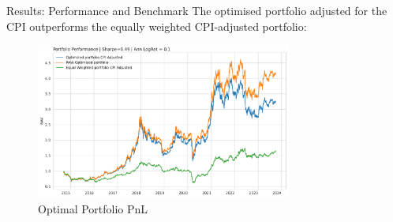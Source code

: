 \documentclass{beamer}
\begin{document}
\begin{frame}{Results: Performance and Benchmark}
The optimised portfolio adjusted for the CPI outperforms the equally weighted CPI-adjusted portfolio:
  \begin{figure}
    \centering
    \includegraphics[width=0.75\textwidth]{paper/figure/PNL.pdf}
    \caption{Optimal Portfolio PnL}
  \end{figure}
\end{frame}
\end{document}
